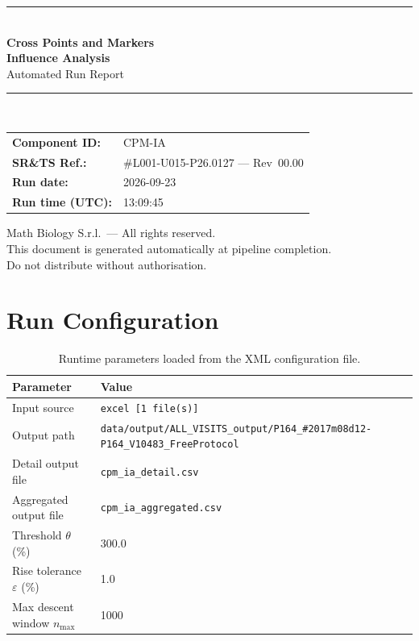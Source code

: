 \documentclass[a4paper,11pt]{article}
\begin{document}
\begin{titlepage}
\begin{center}
  \vspace*{1.8cm}
  {\color{dmaaccent}\rule{\linewidth}{1.5pt}}\\[0.6cm]
  {\LARGE\bfseries\color{dmaaccent}
    Cross Points and Markers\\[0.25cm]
    Influence Analysis}\\[0.4cm]
  {\Large Automated Run Report}\\[0.3cm]
  {\color{dmaaccent}\rule{\linewidth}{1.5pt}}\\[2cm]

  \begin{tabular}{ll}
    \textbf{Component ID:}   & CPM-IA \\[0.3cm]
    \textbf{SR\&TS Ref.:}    & \#L001-U015-P26.0127 --- Rev~00.00 \\[0.3cm]
    \textbf{Run date:}       & 2026-09-23 \\[0.3cm]
    \textbf{Run time (UTC):} & 13:09:45 \\
  \end{tabular}

  \vfill
  {\color{dmagray}\small
    Math Biology S.r.l.\ --- All rights reserved.\\
    This document is generated automatically at pipeline completion.\\
    Do not distribute without authorisation.}
\end{center}
\end{titlepage}

\tableofcontents
\clearpage

\section{Run Configuration}

\begin{table}[h!]
\centering
\small
\caption{Runtime parameters loaded from the XML configuration file.}
\begin{tabular}{ll}
\toprule
\textbf{Parameter} & \textbf{Value} \\
\midrule
Input source                      & \texttt{excel [1 file(s)]} \\
Output path                       & \texttt{data/output/ALL\_VISITS\_output/P164\_\#2017m08d12-P164\_V10483\_FreeProtocol} \\
Detail output file                & \texttt{cpm\_ia\_detail.csv} \\
Aggregated output file            & \texttt{cpm\_ia\_aggregated.csv} \\
Threshold $\theta$ (\%)           & 300.0 \\
Rise tolerance $\varepsilon$ (\%) & 1.0 \\
Max descent window $n_{\max}$     & 1000 \\
\bottomrule
\end{tabular}
\end{table}
\end{document}
